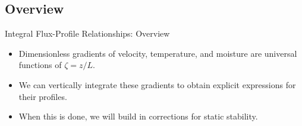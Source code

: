 \subsection{Overview}
\begin{frame}{Integral Flux-Profile Relationships: Overview}
\begin{itemize}
	\item Dimensionless gradients of velocity, temperature, and moisture are universal functions of $\zeta = z/L$.
	\item We can vertically integrate these gradients to obtain explicit expressions for their profiles.
	\item When this is done, we will build in corrections for static stability.
\end{itemize}
\end{frame}
